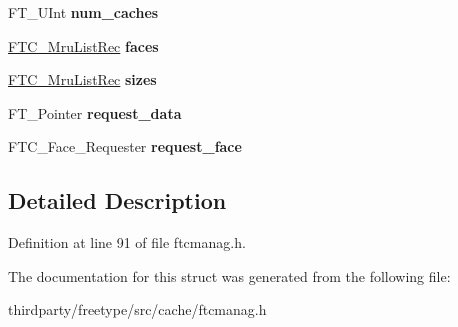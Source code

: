 \begin{DoxyCompactItemize}
F\+T\+\_\+\+U\+Int {\bfseries num\+\_\+caches}
\item 
\mbox{\label{struct_f_t_c___manager_rec___a4966919dd06b7e62f1296c95b6400c55}} 
\hyperlink{struct_f_t_c___mru_list_rec__}{F\+T\+C\+\_\+\+Mru\+List\+Rec} {\bfseries faces}
\item 
\mbox{\label{struct_f_t_c___manager_rec___ac73369768724b8c3bebd23697d4e24d9}} 
\hyperlink{struct_f_t_c___mru_list_rec__}{F\+T\+C\+\_\+\+Mru\+List\+Rec} {\bfseries sizes}
\item 
\mbox{\label{struct_f_t_c___manager_rec___a0b2fef4308a5fa792bc5017ad03095e8}} 
F\+T\+\_\+\+Pointer {\bfseries request\+\_\+data}
\item 
\mbox{\label{struct_f_t_c___manager_rec___a99195fc1d6b81a12957ba9cc0a6b7c93}} 
F\+T\+C\+\_\+\+Face\+\_\+\+Requester {\bfseries request\+\_\+face}
\end{DoxyCompactItemize}


\subsection{Detailed Description}


Definition at line 91 of file ftcmanag.\+h.



The documentation for this struct was generated from the following file\+:\begin{DoxyCompactItemize}
\item 
thirdparty/freetype/src/cache/ftcmanag.\+h\end{DoxyCompactItemize}
